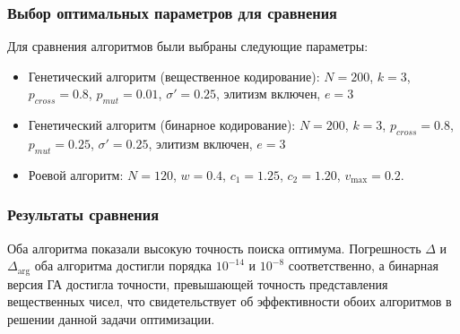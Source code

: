 \documentclass[12pt,a4paper]{article}
\begin{document}
\subsubsection{Выбор оптимальных параметров для сравнения}
Для сравнения алгоритмов были выбраны следующие параметры:
\begin{itemize}
    \item Генетический алгоритм (вещественное кодирование): \(N = 200\), \(k = 3\), \(p_{cross} = 0.8\), \(p_{mut} = 0.01\),  \(\sigma' = 0.25\),  элитизм включен, \(e = 3\)
    \item Генетический алгоритм (бинарное кодирование): \(N = 200\), \(k = 3\), \(p_{cross} = 0.8\), \(p_{mut} = 0.25\),  \(\sigma' = 0.25\),  элитизм включен, \(e = 3\)
    \item Роевой алгоритм: \(N = 120\), \(w = 0.4\), \(c_1 = 1.25\), \(c_2 = 1.20\), \(v_{\max} = 0.2\).
\end{itemize}

\subsubsection{Результаты сравнения}
\begin{table}[H]
    \centering
    \caption{Сравнение генетического и роевого алгоритма.}
    \label{tab:comparison}
\end{table}

Оба алгоритма показали высокую точность поиска оптимума. Погрешность \(\Delta\) и \(\Delta_{\arg}\) оба алгоритма достигли порядка \(10^{-14}\) и \(10^{-8}\) соответственно,
а бинарная версия ГА достигла точности, превышающей точность представления вещественных чисел, что свидетельствует об эффективности обоих алгоритмов в решении данной задачи оптимизации.
\end{document}
